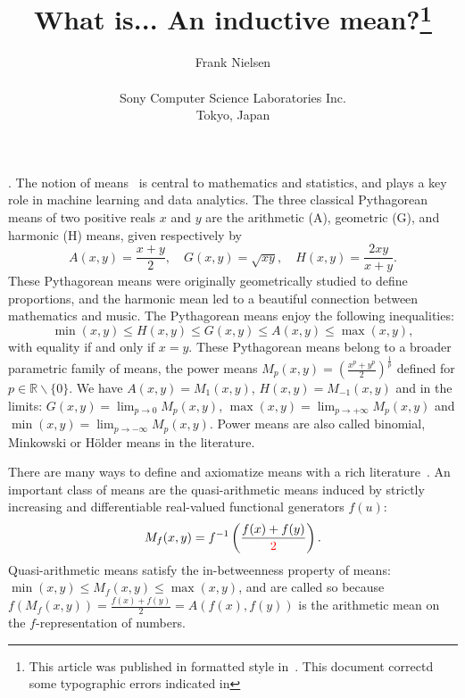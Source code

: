 \documentclass{article}
\def\correction#1{{\color{red}{#1}}}
\def\bbR{\mathbb{R}}
\begin{document}
\title{What is... An inductive mean?\thanks{This article was published in formatted style in~\cite{whatis-2023}. This document correctd some typographic errors indicated in \correction{red}}}

\author{Frank Nielsen\\ \ \\ Sony Computer Science Laboratories Inc.\\ Tokyo, Japan}

\date{}

\maketitle

. 
The notion of means~\cite{de2016mean} is central to mathematics and statistics, and  plays a key role in machine learning and data analytics.  
The three classical Pythagorean means of two positive reals $x$ and $y$ are the arithmetic  (A), geometric  (G), 
and  harmonic (H) means, given respectively by
$$
A(x,y) = \frac{x+y}{2},\quad
G(x,y) = \sqrt{xy},\quad
H(x,y) = \frac{2xy}{x+y}.
$$
These  Pythagorean means were originally geometrically studied to define proportions, and the harmonic mean 
led to a beautiful connection between mathematics and music.
The Pythagorean means enjoy the following inequalities:
$$
\min(x,y)\leq H(x,y)\leq G(x,y)\leq A(x,y)\leq \max(x,y),
$$
with equality if and only if $x=y$.
These Pythagorean means belong to a broader parametric family of means, the power means $M_p(x,y)=\left(\frac{x^p+y^p}{2}\right)^\frac{1}{p}$ 
defined for $p\in\bbR\backslash\{0\}$.
We have $A(x,y)=M_1(x,y)$, $H(x,y)=M_{-1}(x,y)$ and in the limits: $G(x,y)=\lim_{p\rightarrow 0} M_p(x,y)$, 
$\max(x,y)=\lim_{p\rightarrow+\infty} M_p(x,y)$ and 
$\min(x,y)=\lim_{p\rightarrow-\infty} M_p(x,y)$.
Power means are also called binomial, Minkowski or H\"older means in the literature.

There are many ways to define and axiomatize means with a rich literature~\cite{bullen2003handbook}.
An important class of means are the quasi-arithmetic means induced by strictly increasing and differentiable real-valued functional generators $f(u)$:
\begin{equation}\label{eq:qam}
M_f(x,y)=f^{-1}\left(\frac{f(x)+f(y)}{\correction{2}}\right).
\end{equation}
Quasi-arithmetic means satisfy the in-betweenness property of means: 
$\min(x,y)\leq M_f(x,y)\leq \max(x,y)$, and are called so because $f(M_f(x,y))=\frac{f(x)+f(y)}{2}=A(f(x),f(y))$ is the arithmetic mean on the $f$-representation of numbers.
\end{document}

